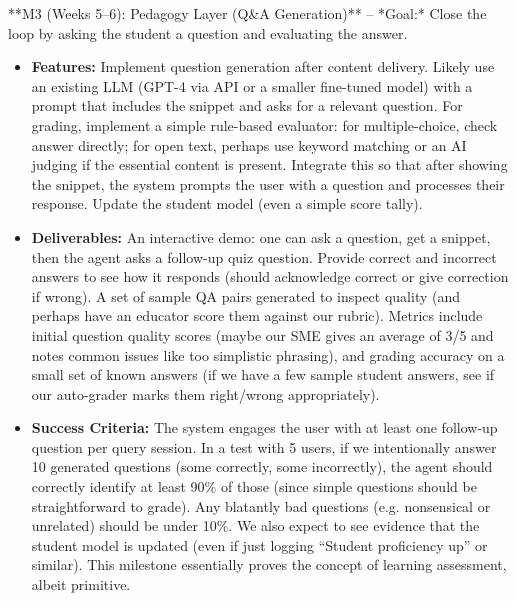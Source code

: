 \documentclass[11pt]{article}
\begin{document}
**M3 (Weeks 5–6): Pedagogy Layer (Q\&A Generation)** – *Goal:* Close the loop by asking the student a question and evaluating the answer.
  \begin{itemize}
    \item \textbf{Features:} Implement question generation after content delivery. Likely use an existing LLM (GPT-4 via API or a smaller fine-tuned model) with a prompt that includes the snippet and asks for a relevant question. For grading, implement a simple rule-based evaluator: for multiple-choice, check answer directly; for open text, perhaps use keyword matching or an AI judging if the essential content is present. Integrate this so that after showing the snippet, the system prompts the user with a question and processes their response. Update the student model (even a simple score tally).
    \item \textbf{Deliverables:} An interactive demo: one can ask a question, get a snippet, then the agent asks a follow-up quiz question. Provide correct and incorrect answers to see how it responds (should acknowledge correct or give correction if wrong). A set of sample QA pairs generated to inspect quality (and perhaps have an educator score them against our rubric). Metrics include initial question quality scores (maybe our SME gives an average of 3/5 and notes common issues like too simplistic phrasing), and grading accuracy on a small set of known answers (if we have a few sample student answers, see if our auto-grader marks them right/wrong appropriately).
    \item \textbf{Success Criteria:} The system engages the user with at least one follow-up question per query session. In a test with 5 users, if we intentionally answer 10 generated questions (some correctly, some incorrectly), the agent should correctly identify at least 90\% of those (since simple questions should be straightforward to grade). Any blatantly bad questions (e.g. nonsensical or unrelated) should be under 10\%. We also expect to see evidence that the student model is updated (even if just logging “Student proficiency up” or similar). This milestone essentially proves the concept of learning assessment, albeit primitive.
  \end{itemize}
\end{document}

